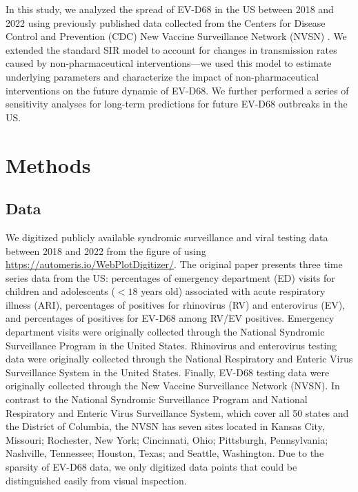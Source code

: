 \documentclass[12pt]{article}
\begin{document}
In this study, we analyzed the spread of EV-D68 in the US between 2018 and 2022 using previously published data collected from the Centers for Disease Control and Prevention (CDC) New Vaccine Surveillance Network (NVSN) \citep{ma2022increase}.
We extended the standard SIR model to account for changes in transmission rates caused by non-pharmaceutical interventions---we used this model to estimate underlying parameters and characterize the impact of non-pharmaceutical interventions on the future dynamic of EV-D68.
We further performed a series of sensitivity analyses for long-term predictions for future EV-D68 outbreaks in the US.

\section{Methods}

\subsection{Data}

We digitized publicly available syndromic surveillance and viral testing data between 2018 and 2022 from the figure of \cite{ma2022increase} using \url{https://automeris.io/WebPlotDigitizer/}.
The original paper presents three time series data from the US: percentages of emergency department (ED) visits for children and adolescents ($<18$ years old) associated with acute respiratory illness (ARI), percentages of positives for rhinovirus (RV) and enterovirus (EV), and percentages of positives for EV-D68 among RV/EV positives.
Emergency department visits were originally collected through the National Syndromic Surveillance Program in the United States.
Rhinovirus and enterovirus testing data were originally collected through the National Respiratory and Enteric Virus Surveillance System in the United States.
Finally, EV-D68 testing data were originally collected through the New Vaccine Surveillance Network (NVSN).
In contrast to the National Syndromic Surveillance Program and National Respiratory and Enteric Virus Surveillance System, which cover all 50 states and the District of Columbia, the NVSN has seven sites located in Kansas City, Missouri; Rochester, New York; Cincinnati, Ohio; Pittsburgh, Pennsylvania; Nashville, Tennessee; Houston, Texas; and Seattle, Washington.
Due to the sparsity of EV-D68 data, we only digitized data points that could be distinguished easily from visual inspection.
\end{document}
